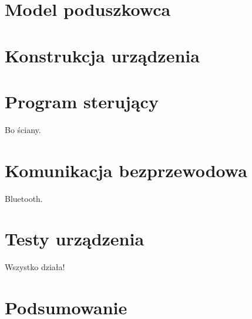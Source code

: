 \documentclass[a4paper, 12pt, twoside, openright]{report}
\begin{document}
\chapter{Model poduszkowca}

\chapter{Konstrukcja urządzenia}

\chapter{Program sterujący}
Bo ściany.
\chapter{Komunikacja bezprzewodowa}
Bluetooth.
\chapter{Testy urządzenia}
Wszystko działa!
\chapter*{Podsumowanie}


\listoffigures
\listoftables



\end{document}
